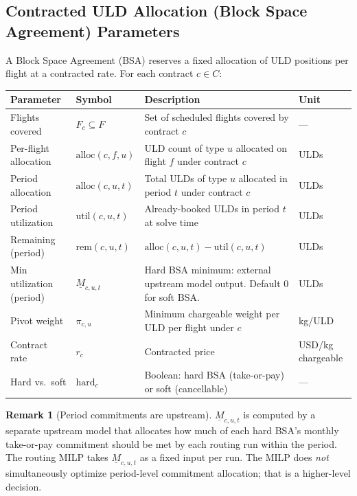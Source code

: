 \documentclass[11pt,a4paper]{article}
\theoremstyle{definition}
\newtheorem{remark}{Remark}
\begin{document}
\subsection{Contracted ULD Allocation (Block Space Agreement) Parameters}
\label{sec:bsa-params}

A Block Space Agreement (BSA) reserves a fixed allocation of ULD positions per flight at a
contracted rate. For each contract $c \in C$:

\begin{center}
\begin{tabular}{llp{6.5cm}l}
\toprule
Parameter & Symbol & Description & Unit \\
\midrule
Flights covered & $F_c \subseteq F$ & Set of scheduled flights covered by contract $c$ & — \\
Per-flight allocation & $\text{alloc}(c, f, u)$ & ULD count of type $u$ allocated on flight $f$ under contract $c$ & ULDs \\
Period allocation & $\text{alloc}(c, u, t)$ & Total ULDs of type $u$ allocated in period $t$ under contract $c$ & ULDs \\
Period utilization & $\text{util}(c, u, t)$ & Already-booked ULDs in period $t$ at solve time & ULDs \\
Remaining (period) & $\text{rem}(c, u, t)$ & $\text{alloc}(c,u,t) - \text{util}(c,u,t)$ & ULDs \\
Min utilization (period) & $\underline{M}_{c,u,t}$ & Hard BSA minimum: external upstream model output. Default $0$ for soft BSA. & ULDs \\
Pivot weight & $\pi_{c,u}$ & Minimum chargeable weight per ULD per flight under $c$ & kg/ULD \\
Contract rate & $r_c$ & Contracted price & USD/kg chargeable \\
Hard vs.\ soft & $\text{hard}_c$ & Boolean: hard BSA (take-or-pay) or soft (cancellable) & — \\
\bottomrule
\end{tabular}
\end{center}

\begin{remark}[Period commitments are upstream]
$\underline{M}_{c,u,t}$ is computed by a separate upstream model that allocates how much of
each hard BSA's monthly take-or-pay commitment should be met by each routing run within the
period. The routing MILP takes $\underline{M}_{c,u,t}$ as a fixed input per run. The MILP
does \emph{not} simultaneously optimize period-level commitment allocation; that is a
higher-level decision.
\end{remark}
\end{document}
